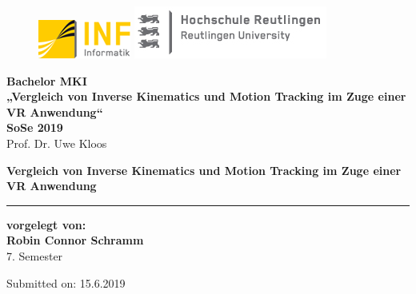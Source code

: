 \begin{titlepage}

\begin{center}

\begin{figure}
\begin{minipage}[H]{4cm}
\centering
\includegraphics[width=0.8\linewidth]{Bilder/Deckblatt/universityLogo}
\end{minipage}
\hfill
\begin{minipage}[H]{6cm}
\centering
\includegraphics[width=1\linewidth]{Bilder/Deckblatt/CompanyLogo}
\end{minipage}
\end{figure}

\vspace*{0.8cm}

\textbf{Bachelor MKI}\\
\textbf{„Vergleich von Inverse Kinematics und Motion Tracking im Zuge einer VR Anwendung“} \\
\vspace*{0.2cm}
{\large \textbf{SoSe 2019\\}}
\vspace*{0.4cm}
Prof. Dr. Uwe Kloos\\
\vspace*{0.8cm}

\textbf{{\large {\Large Vergleich von Inverse Kinematics und Motion Tracking im Zuge einer VR Anwendung }}}\\

\noindent\rule{\textwidth}{2pt}
\vspace*{0.6cm}

\textbf{vorgelegt von:\\}
{\large \textbf{Robin Connor Schramm\\}}
7. Semester 

\vspace*{0.6cm}

\vspace*{0.6cm}

Submitted on:	15.6.2019



\end{center}

\end{titlepage}